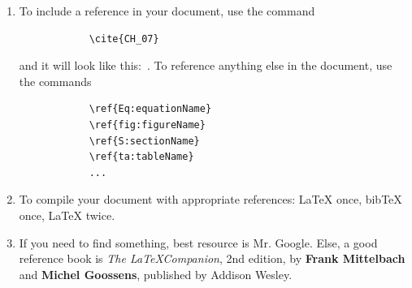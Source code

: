 \documentclass[11pt]{amsart}
\theoremstyle{plain}%
\theoremstyle{definition}
\theoremstyle{remark}
\numberwithin{equation}{section}
\begin{document}
\begin{enumerate}
    \item To include a reference in your document, use the command
        \begin{verbatim}
            \cite{CH_07}
         \end{verbatim}
         and it will look like this:~\cite{CH_07}.  To reference anything else in the document, use the          commands
        \begin{verbatim}
            \ref{Eq:equationName}
            \ref{fig:figureName}
            \ref{S:sectionName}
            \ref{ta:tableName}
            ...
         \end{verbatim}

    \item To compile your document with appropriate references: LaTeX once, bibTeX once, LaTeX twice.
    \item If you need to find something, best resource is Mr. Google. Else, a good reference book is {\em The \LaTeX Companion}, 2nd edition, by {\bf Frank Mittelbach} and {\bf Michel Goossens}, published by Addison Wesley.
\end{enumerate}




\end{document}
